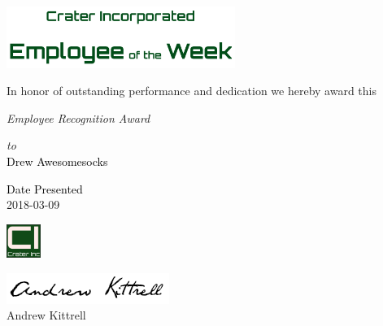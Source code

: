 \documentclass[landscape]{article}
\begin{document}

\centering
\begin{minipage}{.33\textwidth}
{\centering

\begin{minipage}{.9\textwidth}
\centering
\includegraphics[height=2.0cm] {_employee-of-the-week.png}
\end{minipage}


\vspace{2mm}
\textcolor{green!10!black!90}{
\tiny In honor of outstanding performance and dedication we hereby award this}

\smallskip

\textcolor{red!30!black!90}
{\textit{Employee Recognition Award}}

\textcolor{red!30!black!90}
{\textit{to}}\\

\vspace{1mm}
\textcolor{black} {
\large Drew Awesomesocks }

\vspace{2.5mm}


\begin{multicols}{3}
\vspace{1cm}
\textcolor{black}{
\tiny Date Presented }\\
\tiny 2018-03-09

\columnbreak

\includegraphics[height=1.1cm]{ciLogo.jpg}

\columnbreak

\includegraphics[height=.5cm] {_Kittrell.png}\\
\tiny Andrew Kittrell
\end{multicols}

\vspace{1mm}
}
\end{minipage}
\end{document}
